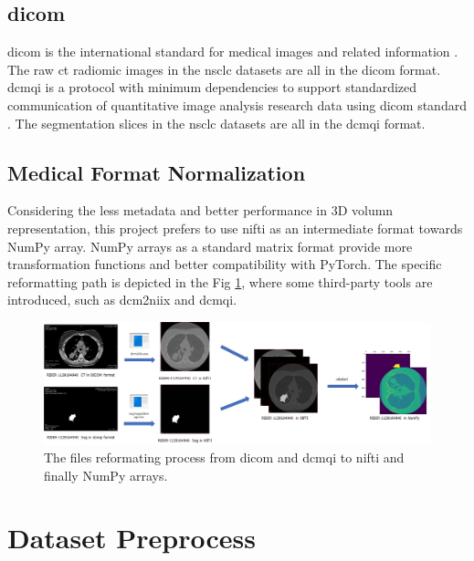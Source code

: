 \documentclass[11pt,times,oneside,openright]{eeereport}
\begin{document}
\subsection{\acrlong{dicom}}
\acrfull{dicom} is the international standard for medical images and related information \cite{mustra2008overview}. The raw \acrshort{ct} radiomic images in the \acrshort{nsclc} datasets are all in the \acrshort{dicom} format. \acrfull{dcmqi} is a protocol with minimum dependencies to support standardized communication of quantitative image analysis research data using \acrshort{dicom} standard \cite{herz2017dcmqi}. The segmentation slices in the \acrshort{nsclc} datasets are all in the \acrshort{dcmqi} format.

\subsection{Medical Format Normalization}
Considering the less metadata and better performance in 3D volumn representation, this project prefers to use \acrshort{nifti} as an intermediate format towards NumPy array. NumPy arrays as a standard matrix format provide more transformation functions and better compatibility with PyTorch. The specific reformatting path is depicted in the Fig \ref{fig:reformat_path}, where some third-party tools are introduced, such as dcm2niix and dcmqi.

\begin{figure}[h]
    \centering
    \includegraphics[width=\textwidth]{fig/reformat_path.png}
    \caption{The files reformating process from \acrshort{dicom} and \acrshort{dcmqi} to \acrshort{nifti} and finally NumPy arrays.}
    \label{fig:reformat_path}
\end{figure}

\section{Dataset Preprocess}
\end{document}
